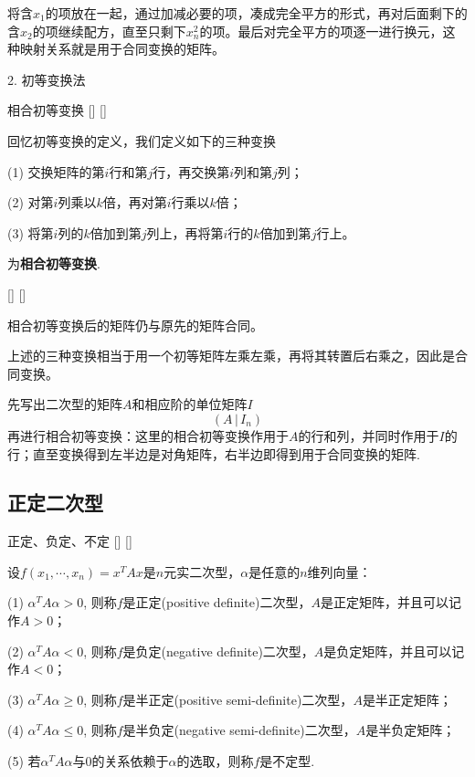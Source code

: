 \documentclass[UTF8]{ctexart}
\begin{document}
		将含$x_1$的项放在一起，通过加减必要的项，凑成完全平方的形式，再对后面剩下的含$x_2$的项继续配方，直至只剩下$x_n^2$的项。最后对完全平方的项逐一进行换元，这种映射关系就是用于合同变换的矩阵。

			{}
			{2. 初等变换法}
			{}
			{}

		\begin{dfn}
			[]
			{相合初等变换}
			[]
			[]

			回忆初等变换的定义，我们定义如下的三种变换

			(1) 交换矩阵的第$i$行和第$j$行，再交换第$i$列和第$j$列；

			(2) 对第$i$列乘以$k$倍，再对第$i$行乘以$k$倍；

			(3) 将第$i$列的$k$倍加到第$j$列上，再将第$i$行的$k$倍加到第$j$行上。

			为\textbf{相合初等变换}.
		\end{dfn}
		\begin{thm}
			[]
			{}
			[]
			[]
			
			相合初等变换后的矩阵仍与原先的矩阵合同。
		\end{thm}
		\begin{prf}
			上述的三种变换相当于用一个初等矩阵左乘左乘，再将其转置后右乘之，因此是合同变换。
		\end{prf}

		先写出二次型的矩阵$A$和相应阶的单位矩阵$I$ \[(A\,|\,I_n )
		\]
		再进行相合初等变换：这里的相合初等变换作用于$A$的行和列，并同时作用于$I$的行；直至变换得到左半边是对角矩阵，右半边即得到用于合同变换的矩阵.



	\subsection{正定二次型}
		
		\begin{dfn}
			[]
			{正定、负定、不定}
			[]
			[]

			设$f(x_1,\cdots,x_n)=x^{T}Ax$是$n$元实二次型，$\alpha$是任意的$n$维列向量：

			(1) $\alpha^{T}A\alpha>0$, 则称$f$是正定(positive definite)二次型，$A$是正定矩阵，并且可以记作$A>0$；

			(2) $\alpha^{T}A\alpha<0$, 则称$f$是负定(negative definite)二次型，$A$是负定矩阵，并且可以记作$A<0$；

			(3) $\alpha^{T}A\alpha\geq  0$, 则称$f$是半正定(positive semi-definite)二次型，$A$是半正定矩阵；

			(4) $\alpha^{T}A\alpha\leq 0$, 则称$f$是半负定(negative semi-definite)二次型，$A$是半负定矩阵；

			(5) 若$\alpha^{T}A\alpha$与0的关系依赖于$\alpha$的选取，则称$f$是不定型.
		\end{dfn}
\end{document}
